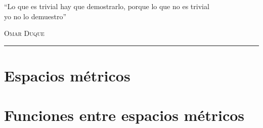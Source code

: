 \documentclass[11pt,a4paper]{book}
\begin{document}
\renewcommand{\contentsname}{\vspace{-1.5cm} Contenido \vspace{-2cm} }


\begin{titlepage}
\vspace*{2cm}

\noindent
\vspace*{0.5cm}

\vspace{1.5cm}
\epigraph{``Lo que es trivial hay que demostrarlo, porque lo que no es trivial\\ yo no lo demuestro''}%
{ \textsc{Omar Duque}}
\null\vfill
\vspace*{1cm}
\noindent
\hfill
\begin{minipage}{0.7\linewidth}
    \begin{flushright}
        \printauthor
    \end{flushright}
\end{minipage}
%
\begin{minipage}{0.02\linewidth}
    \rule{1pt}{140pt}
\end{minipage}
\titlepagedecoration
\end{titlepage}


\tableofcontents
\cleardoublepage


\chapter{Espacios métricos}

\chapter{Funciones entre espacios métricos}

\end{document}
